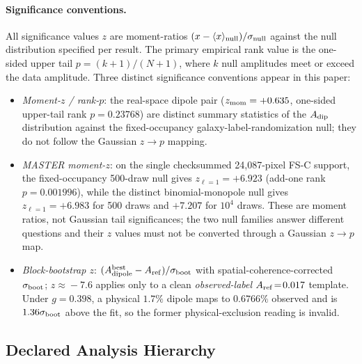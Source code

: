 \documentclass[twocolumn,linenumbers]{aastex702}
\newcommand{\FSC}{\textsc{FS-C}}
\begin{document}
\paragraph{Significance conventions.}
All significance values $z$ are moment-ratios $(x - \langle x\rangle_{\rm null})/\sigma_{\rm null}$ against the null distribution specified per result. The primary empirical rank value is the one-sided upper tail $p=(k+1)/(N+1)$, where $k$ null amplitudes meet or exceed the data amplitude. Three distinct significance conventions appear in this paper:
\begin{itemize}\setlength{\itemsep}{0pt}
\item \emph{Moment-$z$ / rank-$p$}: the real-space dipole pair ($z_{\rm mom}=+0.635$, one-sided upper-tail rank $p=0.23768$) are distinct summary statistics of the $A_{\rm dip}$ distribution against the fixed-occupancy galaxy-label-randomization null; they do not follow the Gaussian $z\!\to\!p$ mapping.
\item \emph{MASTER moment-$z$}: on the single checksummed 24,087-pixel \FSC{} support, the fixed-occupancy 500-draw null gives $z_{\ell=1}=+6.923$ (add-one rank $p=0.001996$), while the distinct binomial-monopole null gives $z_{\ell=1}=+6.983$ for 500 draws and $+7.207$ for $10^4$ draws. These are moment ratios, not Gaussian tail significances; the two null families answer different questions and their $z$ values must not be converted through a Gaussian $z\!\to p$ map.
\item \emph{Block-bootstrap $z$}: $(A_{\rm dipole}^{\rm best} - A_{\rm ref})/\sigma_{\rm boot}$ with spatial-coherence-corrected $\sigma_{\rm boot}$; $z\!\approx\!-7.6$ applies only to a clean \emph{observed-label} $A_{\rm ref}\!=\!0.017$ template. Under $g=0.398$, a physical $1.7\%$ dipole maps to $0.6766\%$ observed and is $1.36\sigma_{\rm boot}$ above the fit, so the former physical-exclusion reading is invalid.
\end{itemize}

\subsection{Declared Analysis Hierarchy}
\label{sec:prereg}
\end{document}
